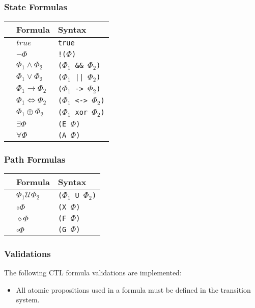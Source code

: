 \documentclass[11pt]{article}
\begin{document}
\subsubsection{State Formulas}

\begin{tabular}{l|ll}
  & Formula & Syntax \\
  \hline
  & $true$ & \verb|true| \\
  & $\neg\Phi$ & \verb|!(|$\Phi$\verb|)| \\
  & $\Phi_1 \wedge \Phi_2$ & \verb|(|$\Phi_1$\verb| && |$\Phi_2$\verb|)| \\
  & $\Phi_1 \vee \Phi_2$ & \verb|(|$\Phi_1$\verb[ || [$\Phi_2$\verb|)| \\
  & $\Phi_1 \rightarrow \Phi_2$ & \verb|(|$\Phi_1$\verb| -> |$\Phi_2$\verb|)| \\
  & $\Phi_1 \iff \Phi_2$ & \verb|(|$\Phi_1$\verb| <-> |$\Phi_2$\verb|)| \\
  & $\Phi_1 \oplus \Phi_2$ & \verb|(|$\Phi_1$\verb| xor |$\Phi_2$\verb|)| \\
  & $\exists \Phi$ & \verb|(E |$\Phi$\verb|)| \\
  & $\forall \Phi$ & \verb|(A |$\Phi$\verb|)| \\
\end{tabular}

\subsubsection{Path Formulas}

\begin{tabular}{l|ll}
  & Formula & Syntax \\
  \hline
  & $\Phi_1 \mathcal{U} \Phi_2$ & \verb|(|$\Phi_1$\verb| U |$\Phi_2$\verb|)| \\
  & $\circ \Phi$ & \verb|(X |$\Phi$\verb|)| \\
  & $\diamond \Phi$ & \verb|(F |$\Phi$\verb|)| \\
  & $\square \Phi$ & \verb|(G |$\Phi$\verb|)| \\
\end{tabular}

\subsubsection{Validations}

The following CTL formula validations are implemented:

\begin{itemize}
  \item All atomic propositions used in a formula must be defined in the transition system.
\end{itemize}
\end{document}
